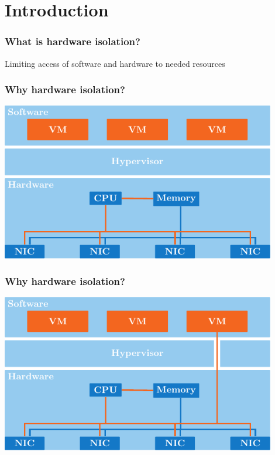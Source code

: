 \section{Introduction}

\begin{frame}
    \frametitle{What is hardware isolation?}

    \begin{center}
        Limiting access of software and hardware to needed resources
    \end{center}
\end{frame}

\begin{frame}
    \frametitle{Why hardware isolation?}

    \begin{center}
        \includegraphics[width=0.9\textwidth]{figures/hypervisor-vms.pdf}
    \end{center}
\end{frame}

\begin{frame}
    \frametitle{Why hardware isolation?}

    \begin{center}
        \includegraphics[width=0.9\textwidth]{figures/hypervisor-vms-pt.pdf}
    \end{center}
\end{frame}

